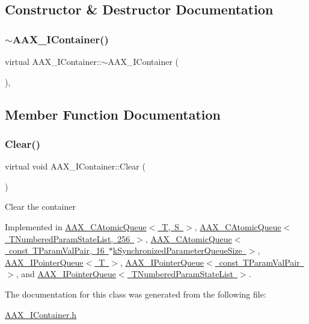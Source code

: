 \subsection{Constructor \& Destructor Documentation}
\mbox{\label{a01785_ac8974c4fdc9352dc662bf7242b83c7c9}} 
\subsubsection{\texorpdfstring{$\sim$AAX\_IContainer()}{~AAX\_IContainer()}}
{\footnotesize\ttfamily virtual A\+A\+X\+\_\+\+I\+Container\+::$\sim$\+A\+A\+X\+\_\+\+I\+Container (\begin{DoxyParamCaption}{ }\end{DoxyParamCaption})\hspace{0.3cm}{\ttfamily [inline]}, {\ttfamily [virtual]}}



\subsection{Member Function Documentation}
\mbox{\label{a01785_a35280907fac53883d3501beef8c30596}} 
\subsubsection{\texorpdfstring{Clear()}{Clear()}}
{\footnotesize\ttfamily virtual void A\+A\+X\+\_\+\+I\+Container\+::\+Clear (\begin{DoxyParamCaption}{ }\end{DoxyParamCaption})\hspace{0.3cm}{\ttfamily [pure virtual]}}

Clear the container 

Implemented in \mbox{\hyperlink{a01441_a9819ff531e285f2acd2c9fd2351617c4}{A\+A\+X\+\_\+\+C\+Atomic\+Queue$<$ T, S $>$}}, \mbox{\hyperlink{a01441_a9819ff531e285f2acd2c9fd2351617c4}{A\+A\+X\+\_\+\+C\+Atomic\+Queue$<$ T\+Numbered\+Param\+State\+List, 256 $>$}}, \mbox{\hyperlink{a01441_a9819ff531e285f2acd2c9fd2351617c4}{A\+A\+X\+\_\+\+C\+Atomic\+Queue$<$ const T\+Param\+Val\+Pair, 16 $\ast$k\+Synchronized\+Parameter\+Queue\+Size $>$}}, \mbox{\hyperlink{a01861_a42bdf5794a2481d0ae3f294fd8f8203e}{A\+A\+X\+\_\+\+I\+Pointer\+Queue$<$ T $>$}}, \mbox{\hyperlink{a01861_a42bdf5794a2481d0ae3f294fd8f8203e}{A\+A\+X\+\_\+\+I\+Pointer\+Queue$<$ const T\+Param\+Val\+Pair $>$}}, and \mbox{\hyperlink{a01861_a42bdf5794a2481d0ae3f294fd8f8203e}{A\+A\+X\+\_\+\+I\+Pointer\+Queue$<$ T\+Numbered\+Param\+State\+List $>$}}.



The documentation for this class was generated from the following file\+:\begin{DoxyCompactItemize}
\item 
\mbox{\hyperlink{a00572}{A\+A\+X\+\_\+\+I\+Container.\+h}}\end{DoxyCompactItemize}
